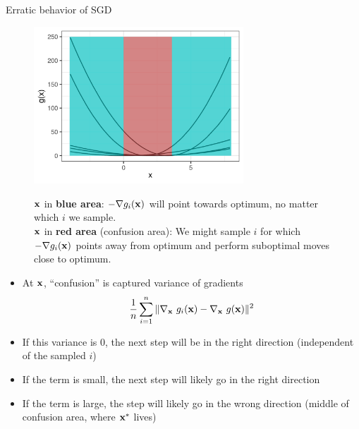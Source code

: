 \documentclass[11pt,compress,t,notes=noshow, xcolor=table]{beamer}
\begin{document}
\begin{vbframe}{Erratic behavior of SGD}

 	\begin{figure}
 		\vspace{-0.3cm}
 		\centering
 		\includegraphics[width = 0.7\textwidth]{figure_man/sgd_example_confusion_areas.png} \newline
        \begin{footnotesize}
  $\mathbf{x}$ in \textbf{blue area}: $- \nabla g_i(\mathbf{x})$ will point towards optimum, no matter which $i$ we sample. \\ $\mathbf{x}$ in \textbf{red area} (confusion area): We might sample $i$ for which $- \nabla g_i(\mathbf{x})$ points away from optimum and perform suboptimal moves close to optimum. 
        \end{footnotesize}

  \end{figure}



 	\framebreak 

	\begin{itemize}
		\item At $\mathbf{x}$, \enquote{confusion} is captured variance of gradients
		$$
			\frac{1}{n}\sum\limits_{i=1}^n \|\nabla_{\mathbf{x}}~ g_i(\mathbf{x}) - \nabla_{\mathbf{x}} ~ g(\mathbf{x})\|^2
		$$
		\item If this variance is $0$, the next step will be in the right direction (independent of the sampled $i$)
		\item If the term is small, the next step will likely go in the right direction
		\item If the term is large, the step will likely go in the wrong direction (middle of confusion area, where $\mathbf{x}^\ast$ lives)
	\end{itemize}

\end{vbframe}
\end{document}

